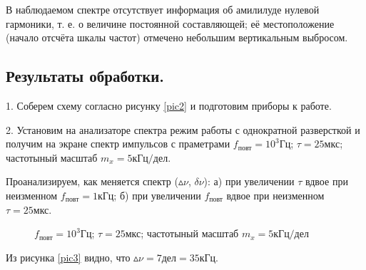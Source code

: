 \documentclass[a4paper,12pt]{article} %
\begin{document}
В наблюдаемом спектре отсутствует информация об амилилуде нулевой гармоники, т. е. о величине постоянной составляющей; её местоположение (начало отсчёта шкалы частот) отмечено небольшим вертикальным выбросом.

\subsection{Результаты обработки.}

1. Соберем схему согласно рисунку \eqref{pic2} и подготовим приборы к работе.

2. Установим на анализаторе спектра режим работы с однократной разверсткой и получим на экране спектр импульсов с праметрами $f_\text{повт} = 10^3\text{Гц}$; $\tau = 25 \text{мкс}$; частотыный масштаб $m_x = 5 \text{кГц/дел}$.

Проанализируем, как меняется спектр ($\vartriangle\nu$, $\delta\nu$): 
а) при увеличении $\tau$ вдвое при неизменном $f_\text{повт} = 1 \text{кГц}$; 
б) при увеличении $f_\text{повт}$ вдвое при неизменном $\tau = 25\text{мкс}$.

\begin{figure}[H]\label{pic3}
 	\caption{$f_\text{повт} = 10^3\text{Гц}$; $\tau = 25 \text{мкс}$; частотыный масштаб $m_x = 5 \text{кГц/дел}$}
\end{figure}

Из рисунка \eqref{pic3} видно, что $\vartriangle\nu = 7 \text{дел} = 35 \text{кГц}$.
\end{document}
